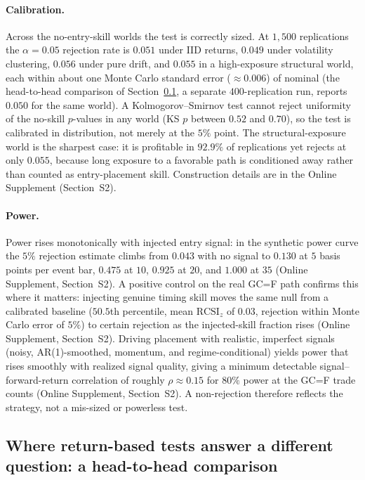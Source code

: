 \documentclass[preprint,12pt]{elsarticle}
\theoremstyle{definition}
\begin{document}
\paragraph{Calibration.} Across the no-entry-skill worlds the test is correctly sized. At $1{,}500$ replications the $\alpha=0.05$ rejection rate is $0.051$ under IID returns, $0.049$ under volatility clustering, $0.056$ under pure drift, and $0.055$ in a high-exposure structural world, each within about one Monte Carlo standard error ($\approx 0.006$) of nominal (the head-to-head comparison of Section~\ref{sec:competitor}, a separate $400$-replication run, reports $0.050$ for the same world). A Kolmogorov--Smirnov test cannot reject uniformity of the no-skill $p$-values in any world (KS $p$ between $0.52$ and $0.70$), so the test is calibrated in distribution, not merely at the $5\%$ point. The structural-exposure world is the sharpest case: it is profitable in $92.9\%$ of replications yet rejects at only $0.055$, because long exposure to a favorable path is conditioned away rather than counted as entry-placement skill. Construction details are in the Online Supplement (Section~S2).

\paragraph{Power.} Power rises monotonically with injected entry signal: in the synthetic power curve the $5\%$ rejection estimate climbs from $0.043$ with no signal to $0.130$ at $5$ basis points per event bar, $0.475$ at $10$, $0.925$ at $20$, and $1.000$ at $35$ (Online Supplement, Section~S2). A positive control on the real GC=F path confirms this where it matters: injecting genuine timing skill moves the same null from a calibrated baseline ($50.5$th percentile, mean $\mathrm{RCSI}_z$ of $0.03$, rejection within Monte Carlo error of $5\%$) to certain rejection as the injected-skill fraction rises (Online Supplement, Section~S2). Driving placement with realistic, imperfect signals (noisy, AR(1)-smoothed, momentum, and regime-conditional) yields power that rises smoothly with realized signal quality, giving a minimum detectable signal--forward-return correlation of roughly $\rho\approx0.15$ for $80\%$ power at the GC=F trade counts (Online Supplement, Section~S2). A non-rejection therefore reflects the strategy, not a mis-sized or powerless test.

\subsection{Where return-based tests answer a different question: a head-to-head comparison}
\label{sec:competitor}
\end{document}
